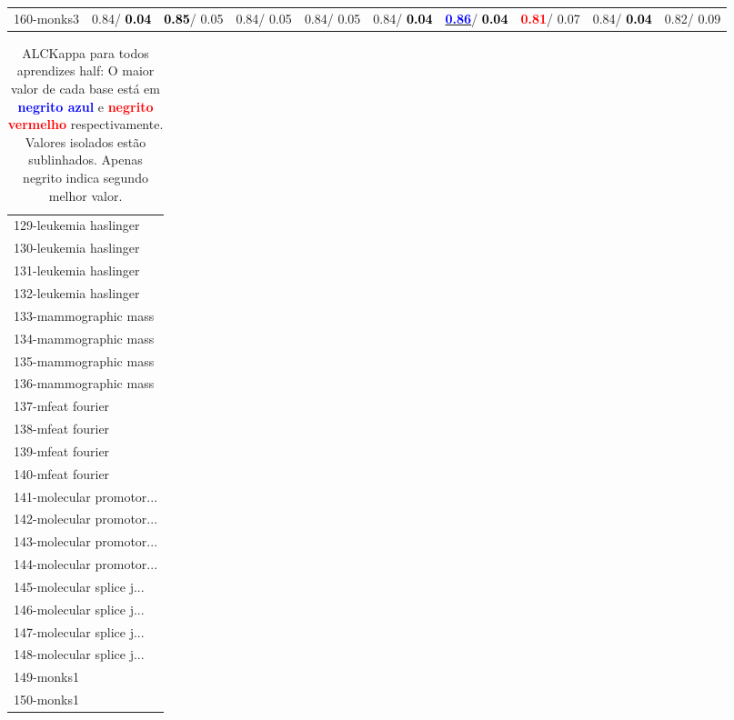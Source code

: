 \begin{table}[h]
\begin{center}
{\begin{tabular}{lc|c|c|c|c|c|c|c|c}
160-monks3 &   0.84/\textcolor{black}{\textbf{  0.04}} & \textcolor{black}{\textbf{  0.85}}/  0.05 &   0.84/  0.05 &   0.84/  0.05 &   0.84/\textcolor{black}{\textbf{  0.04}} & \underline{\textcolor{blue}{\textbf{  0.86}}}/\textcolor{black}{\textbf{  0.04}} & \textcolor{red}{\textbf{  0.81}}/  0.07 &   0.84/\textcolor{black}{\textbf{  0.04}} &   0.82/  0.09 \\\end{tabular}}\label{stratsALCKappa4AllReduxalla}
\end{center}
\end{table}
\begin{table}[h]
\caption{ALCKappa para todos aprendizes half: O maior valor de cada base está em \textcolor{blue}{\textbf{negrito azul}} e \textcolor{red}{\textbf{negrito vermelho}} respectivamente. Valores isolados estão sublinhados. Apenas negrito indica segundo melhor valor.}
\begin{center}\begin{tabular}{l}
 & \\ \hline 129-leukemia haslinger &  \\
130-leukemia haslinger &  \\
131-leukemia haslinger &  \\
132-leukemia haslinger &  \\
133-mammographic mass &  \\
134-mammographic mass &  \\
135-mammographic mass &  \\ \hline
136-mammographic mass &  \\
137-mfeat fourier &  \\
138-mfeat fourier &  \\
139-mfeat fourier &  \\
140-mfeat fourier &  \\
141-molecular promotor... &  \\
142-molecular promotor... &  \\ \hline
143-molecular promotor... &  \\
144-molecular promotor... &  \\
145-molecular splice j... &  \\
146-molecular splice j... &  \\
147-molecular splice j... &  \\
148-molecular splice j... &  \\
149-monks1 &  \\ \hline
150-monks1 &  \\

\end{tabular}
\end{center}
\end{table}
